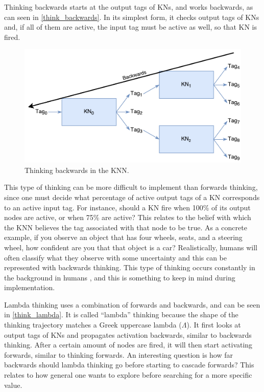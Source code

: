 \documentclass[titlepage,11pt]{article}
\begin{document}
Thinking backwards starts at the output tags of KNs, and works backwards, as can seen in \autoref{think_backwards}. In its simplest form, it checks output tags of KNs and, if all of them are active, the input tag must be active as well, so that KN is fired.

\begin{figure}[!htb]
	\includegraphics[width=\columnwidth]{figures/backwards_thinking.pdf}
	\caption{Thinking backwards in the KNN.}
	\label{think_backwards}
\end{figure}

This type of thinking can be more difficult to implement than forwards thinking, since one must decide what percentage of active output tags of a KN corresponds to an active input tag. For instance, should a KN fire when 100\% of its output nodes are active, or when 75\% are active? This relates to the belief with which the KNN believes the tag associated with that node to be true. As a concrete example, if you observe an object that has four wheels, seats, and a steering wheel, how confident are you that that object is a car? Realistically, humans will often classify what they observe with some uncertainty \cite{uncertainty} and this can be represented with backwards thinking. This type of thinking occurs constantly in the background in humans \cite{vybihal-knowledge}, and this is something to keep in mind during implementation.

Lambda thinking uses a combination of forwards and backwards, and can be seen in \autoref{think_lambda}. It is called ``lambda'' thinking because the shape of the thinking trajectory matches a Greek uppercase lambda ($\Lambda$). It first looks at output tags of KNs and propagates activation backwards, similar to backwards thinking. After a certain amount of nodes are fired, it will then start activating forwards, similar to thinking forwards. An interesting question is how far backwards should lambda thinking go before starting to cascade forwards? This relates to how general one wants to explore before searching for a more specific value.
\end{document}
